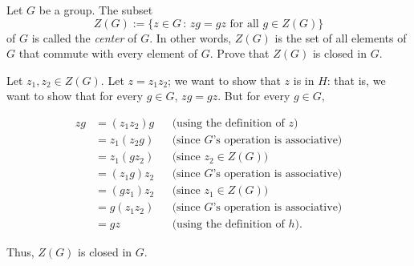 \begin{exercise}[ID=2R, subtitle=(Extra Credit)]
Let $G$ be a group.  The subset $$Z(G):=\{z \in G\,:\, zg=gz \mbox{ for all }g\in Z(G)\}$$ of $G$ is called the \textit{center} of $G$. In other words, $Z(G)$ is the set of all elements of $G$ that commute with every element of $G$.
Prove that $Z(G)$ is closed in $G$. %
\end{exercise}

\begin{solution}[print=false]
Let $z_1, z_2\in Z(G)$.  Let $z=z_1z_2$; we want to
show that $z$ is in $H$: that is, we want to show that for every $g\in G$,
$zg=gz$.  But for every $g\in G$,
\begin{center}
\begin{align*}
zg&=(z_1z_2)g&& \text{(using the definition of $z$)}\\
&=z_1(z_2g)&& \text{(since $G$'s operation is associative)}\\
&=z_1(gz_2)&& \text{(since $z_2\in Z(G)$)}\\
&=(z_1g)z_2 && \text{(since $G$'s operation is associative)}\\
&=(gz_1)z_2 && \text{(since $z_1\in Z(G)$)}\\
&=g(z_1z_2)&&  \text{(since $G$'s operation is associative)}\\
&=gz && \text{(using the definition of $h$)}.
\end{align*}\end{center}
Thus, $Z(G)$ is closed in $G$.

\end{solution} 